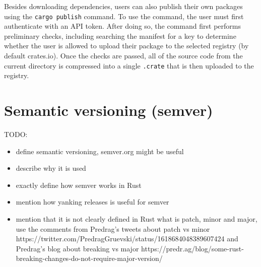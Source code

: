 \documentclass[licencjacka,en]{pracamgr}
\begin{document}
Besides downloading dependencies, users can also publish their own packages using the \texttt{cargo publish} command.
To use the command, the user must first authenticate with an API token. After doing so, the command
first performs preliminary checks, including searching the manifest for a key to determine whether the user
is allowed to upload their package to the selected registry (by default crates.io). Once the checks are passed, all of the
source code from the current directory is compressed into a single \texttt{.crate} that is then uploaded to the registry.


\section{Semantic versioning (semver)}

TODO:
\begin{itemize}
	\item define semantic versioning, semver.org might be useful
	\item describe why it is used
	\item exactly define how semver works in Rust
	\item mention how yanking releases is useful for semver
	\item mention that it is not clearly defined in Rust what is patch, minor and major,
		use the comments from Predrag's tweets about patch vs minor https://twitter.com/PredragGruevski/status/1618684048389607424
		and Predrag's blog about breaking vs major https://predr.ag/blog/some-rust-breaking-changes-do-not-require-major-version/
\end{itemize}
\end{document}

